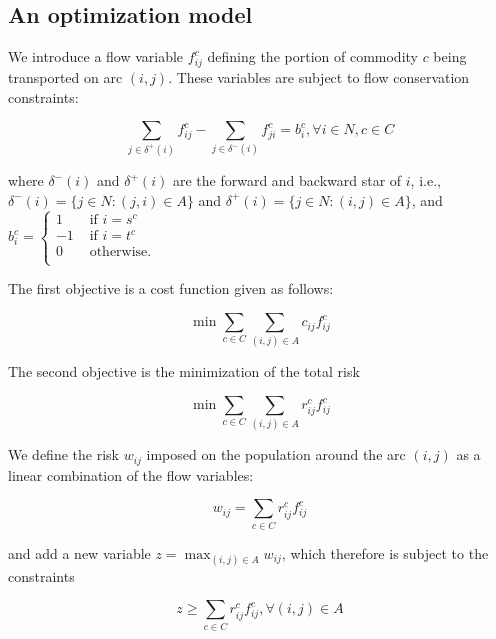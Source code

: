 \documentclass[preprint,12pt]{elsarticle}
\begin{document}
\subsection{An optimization model}
\label{SS_AOM}

We introduce a flow variable $f_{ij}^c$ defining the portion of commodity $c$ being transported on arc $(i,j)$. These variables are subject to flow conservation constraints:

$$\sum_{j \in \delta^+(i)} f_{ij}^c -  \sum_{j \in \delta^-(i)} f_{ji}^c = b_i^c, \forall i \in N,  c \in  C$$

where $\delta^-(i)$ and $\delta^+(i)$ are the forward and backward star of $i$, i.e., $\delta^-(i) = \{j \in N: (j,i)\in A\}$ and $\delta^+(i) = \{j \in N: (i,j)\in A\}$, and $b_i^c=\left\{
\begin{array}{rl}
                     1 & \textrm{ if } i=s^c\\
                    -1 & \textrm{ if } i=t^c\\
                     0 & \textrm{ otherwise.}\\
\end{array}\right.$

The first objective is a cost function given as follows:

$$\min \sum_{c \in C} \sum_{(i,j) \in A} c_{ij} f_{ij}^c$$


The second objective is the minimization of the total risk

$$
\min \sum_{c \in C} \sum_{(i,j) \in A} r_{ij}^c f_{ij}^c
$$

We define the risk $w_{ij}$ imposed on the population around the arc $(i,j)$ as a linear combination of the flow variables: 

$$w_{ij} = \sum_{c \in C} r_{ij}^c f_{ij}^c$$

and add a new variable $z = \max_{(i,j) \in A} w_{ij}$, which therefore is subject to the constraints

$$
z \geq \sum_{c \in C} r_{ij}^c f_{ij}^c, \forall (i,j) \in A
$$

% 
% 
% 
% 
\end{document}
